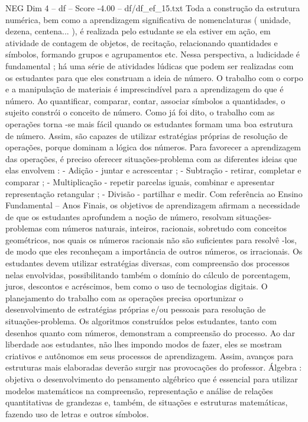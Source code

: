 \begin{textsample}{NEG Dim 4 – df – Score -4.00 – df/df\_ef\_15.txt}
Toda a construção da estrutura numérica, bem como a aprendizagem significativa de nomenclaturas ( unidade, dezena, centena... ), é realizada pelo estudante se ela estiver em ação, em atividade de contagem de objetos, de recitação, relacionando quantidades e símbolos, formando grupos e agrupamentos etc.
Nessa perspectiva, a ludicidade é fundamental ; há uma série de atividades lúdicas que podem ser realizadas com os estudantes para que eles construam a ideia de número.
O trabalho com o corpo e a manipulação de materiais é imprescindível para a aprendizagem do que é número.
Ao quantificar, comparar, contar, associar símbolos a quantidades, o sujeito constrói o conceito de número.
Como já foi dito, o trabalho com as operações torna -se mais fácil quando os estudantes formam uma boa estrutura de número.
Assim, são capazes de utilizar estratégias próprias de resolução de operações, porque dominam a lógica dos números.
Para favorecer a aprendizagem das operações, é preciso oferecer situações-problema com as diferentes ideias que elas envolvem : - Adição - juntar e acrescentar ; - Subtração - retirar, completar e comparar ; - Multiplicação - repetir parcelas iguais, combinar e apresentar representação retangular ; - Divisão - partilhar e medir.
Com referência ao Ensino Fundamental – Anos Finais, os objetivos de aprendizagem afirmam a necessidade de que os estudantes aprofundem a noção de número, resolvam situações-problemas com números naturais, inteiros, racionais, sobretudo com conceitos geométricos, nos quais os números racionais não são suficientes para resolvê -los, de modo que eles reconheçam a importância de outros números, os irracionais.
Os estudantes devem utilizar estratégias diversas, com compreensão dos processos nelas envolvidas, possibilitando também o domínio do cálculo de porcentagem, juros, descontos e acréscimos, bem como o uso de tecnologias digitais.
O planejamento do trabalho com as operações precisa oportunizar o desenvolvimento de estratégias próprias e/ou pessoais para resolução de situações-problema.
Os algoritmos construídos pelos estudantes, tanto com desenhos quanto com números, demonstram a compreensão do processo.
Ao dar liberdade aos estudantes, não lhes impondo modos de fazer, eles se mostram criativos e autônomos em seus processos de aprendizagem.
Assim, avanços para estruturas mais elaboradas deverão surgir nas provocações do professor.
Álgebra : objetiva o desenvolvimento do pensamento algébrico que é essencial para utilizar modelos matemáticos na compreensão, representação e análise de relações quantitativas de grandezas e, também, de situações e estruturas matemáticas, fazendo uso de letras e outros símbolos.

\end{textsample}
